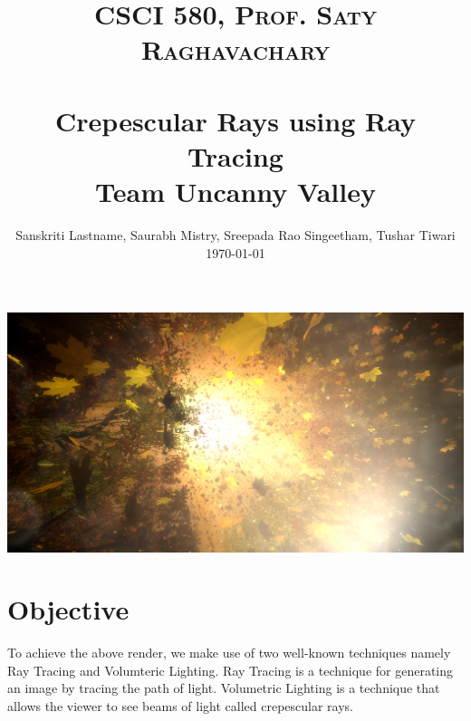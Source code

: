 \documentclass[paper=a4, fontsize=11pt]{scrartcl}
\title{
		\usefont{OT1}{bch}{b}{n}
		\normalfont \normalsize \textsc{CSCI 580, Prof. Saty Raghavachary} \\ [25pt]
		\horrule{0.4pt} \\[0.5cm]
		\huge\textbf{Crepescular Rays using Ray Tracing} \\
		\vspace{10pt}
		\normalsize\textbf{Team Uncanny Valley}
		\horrule{0.4pt} \\[0.5cm]
}
\author{
		\normalfont\normalsize
        Sanskriti Lastname, Saurabh Mistry, Sreepada Rao Singeetham, Tushar Tiwari\\[-3pt]		\normalsize
        \today
}
\date{}
\renewcommand{\headrulewidth}{0pt}			%
\renewcommand{\footrulewidth}{0pt}				%
\numberwithin{equation}{section}		%
\numberwithin{figure}{section}			%
\numberwithin{table}{section}				%
\begin{document}
\maketitle
\begin{center}\includegraphics[width=\textwidth]{Title}\end{center}
\section{Objective}
To achieve the above render, we make use of two well-known techniques namely Ray Tracing and Volumteric Lighting. Ray Tracing is a technique for generating an image by tracing the path of light. Volumetric Lighting is a technique that allows the viewer to see beams of light called crepescular rays.
\newpage
\fancyhf{}
\fancyfoot[CE,CO]{\leftmark}
\fancyfoot[LE,RO]{\thepage}
\renewcommand{\headrulewidth}{1pt}
\renewcommand{\footrulewidth}{1pt}
\end{document}
